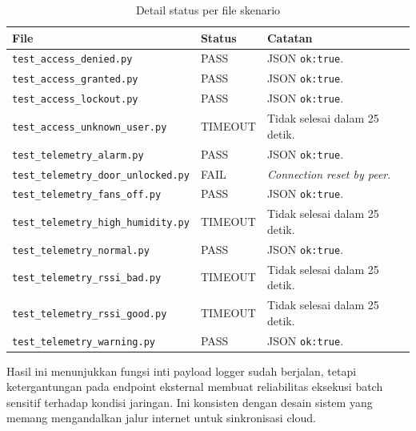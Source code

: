 \documentclass[10pt,a4paper,twocolumn]{article}
\begin{document}
\begin{table}[h]
\centering
\caption{Detail status per file skenario}
\label{tab:run-detail}
\scriptsize
\begin{tabularx}{0.98\columnwidth}{p{}p{}Y}
\toprule
\textbf{File} & \textbf{Status} & \textbf{Catatan} \\ \midrule
\texttt{test\_access\_denied.py} & PASS & JSON \texttt{ok:true}. \\
\texttt{test\_access\_granted.py} & PASS & JSON \texttt{ok:true}. \\
\texttt{test\_access\_lockout.py} & PASS & JSON \texttt{ok:true}. \\
\texttt{test\_access\_unknown\_user.py} & TIMEOUT & Tidak selesai dalam 25 detik. \\
\texttt{test\_telemetry\_alarm.py} & PASS & JSON \texttt{ok:true}. \\
\texttt{test\_telemetry\_door\_unlocked.py} & FAIL & \textit{Connection reset by peer}. \\
\texttt{test\_telemetry\_fans\_off.py} & PASS & JSON \texttt{ok:true}. \\
\texttt{test\_telemetry\_high\_humidity.py} & TIMEOUT & Tidak selesai dalam 25 detik. \\
\texttt{test\_telemetry\_normal.py} & PASS & JSON \texttt{ok:true}. \\
\texttt{test\_telemetry\_rssi\_bad.py} & TIMEOUT & Tidak selesai dalam 25 detik. \\
\texttt{test\_telemetry\_rssi\_good.py} & TIMEOUT & Tidak selesai dalam 25 detik. \\
\texttt{test\_telemetry\_warning.py} & PASS & JSON \texttt{ok:true}. \\
\bottomrule
\end{tabularx}
\end{table}

Hasil ini menunjukkan fungsi inti payload logger sudah berjalan, tetapi ketergantungan pada endpoint eksternal membuat reliabilitas eksekusi batch sensitif terhadap kondisi jaringan. Ini konsisten dengan desain sistem yang memang mengandalkan jalur internet untuk sinkronisasi cloud.
\end{document}
